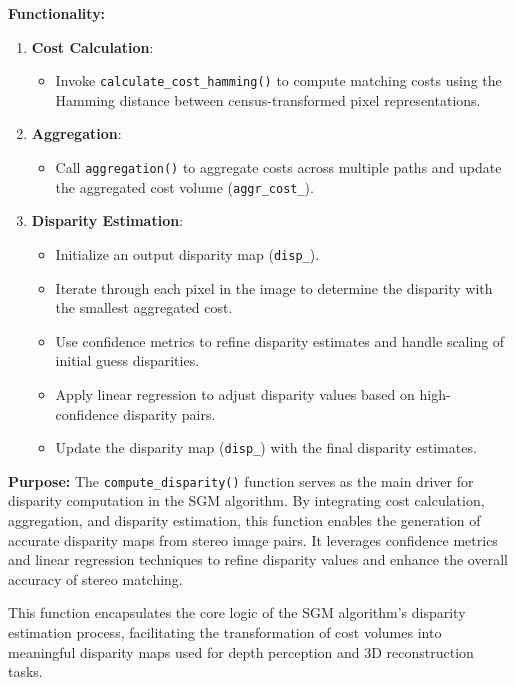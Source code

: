 \documentclass{article}
\begin{document}
\textbf{Functionality:}
\begin{enumerate}
    \item \textbf{Cost Calculation}:
        \begin{itemize}
            \item Invoke \texttt{calculate\_cost\_hamming()} to compute matching costs using the Hamming distance between census-transformed pixel representations.
        \end{itemize}
    
    \item \textbf{Aggregation}:
        \begin{itemize}
            \item Call \texttt{aggregation()} to aggregate costs across multiple paths and update the aggregated cost volume (\texttt{aggr\_cost\_}).
        \end{itemize}
    
    \item \textbf{Disparity Estimation}:
        \begin{itemize}
            \item Initialize an output disparity map (\texttt{disp\_}).
            \item Iterate through each pixel in the image to determine the disparity with the smallest aggregated cost.
            \item Use confidence metrics to refine disparity estimates and handle scaling of initial guess disparities.
            \item Apply linear regression to adjust disparity values based on high-confidence disparity pairs.
            \item Update the disparity map (\texttt{disp\_}) with the final disparity estimates.
        \end{itemize}
\end{enumerate}

\textbf{Purpose:}
The \texttt{compute\_disparity()} function serves as the main driver for disparity computation in the SGM algorithm. By integrating cost calculation, aggregation, and disparity estimation, this function enables the generation of accurate disparity maps from stereo image pairs. It leverages confidence metrics and linear regression techniques to refine disparity values and enhance the overall accuracy of stereo matching.

This function encapsulates the core logic of the SGM algorithm's disparity estimation process, facilitating the transformation of cost volumes into meaningful disparity maps used for depth perception and 3D reconstruction tasks.
\end{document}
